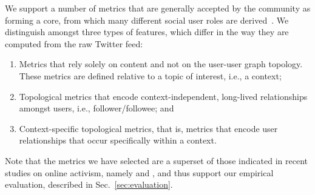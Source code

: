 \documentclass[runningheads]{llncs}
\begin{document}
We support a number of metrics that are generally accepted by the community as forming a core, from which many different social user roles are derived~\cite{RIQUELME2016949}. 
We distinguish amongst three types of features, which differ in the way they are computed from the raw Twitter feed:
\begin{enumerate}
	\item Metrics that rely solely on content and not on the user-user graph topology. These metrics are defined relative to a topic of interest, i.e., a context;
	\item Topological metrics that encode context-independent, long-lived relationships amongst users, i.e., follower/followee; and 
	\item Context-specific topological metrics, that is, metrics that encode user relationships that occur specifically within a context.
\end{enumerate}

Note that the metrics we have selected are a superset of those indicated in recent studies on online activism, namely \cite{Lotan2011} and \cite{Poell2014}, and thus support our empirical evaluation, described in Sec.~\ref{sec:evaluation}.\\
\end{document}
